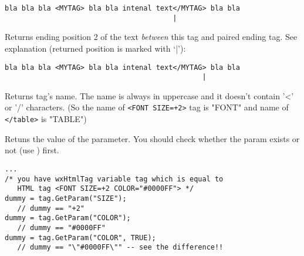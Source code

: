 \begin{verbatim}
bla bla bla <MYTAG> bla bla intenal text</MYTAG> bla bla
                                        |
\end{verbatim}


\label{wxhtmltaggetendpos2}


Returns ending position 2 of the text {\it between} this tag and paired
ending tag.
See explanation (returned position is marked with `|'):

\begin{verbatim}
bla bla bla <MYTAG> bla bla intenal text</MYTAG> bla bla
                                               |
\end{verbatim}

\label{wxhtmltaggetname}


Returns tag's name. The name is always in uppercase and it doesn't contain
'<' or '/' characters. (So the name of {\tt <FONT SIZE=+2>} tag is "FONT"
and name of {\tt </table>} is "TABLE")


\label{wxhtmltaggetparam}


Retuns the value of the parameter. You should check whether the
param exists or not (use ) first.





\begin{verbatim}
...
/* you have wxHtmlTag variable tag which is equal to
   HTML tag <FONT SIZE=+2 COLOR="#0000FF"> */
dummy = tag.GetParam("SIZE");
   // dummy == "+2"
dummy = tag.GetParam("COLOR");
   // dummy == "#0000FF"
dummy = tag.GetParam("COLOR", TRUE);
   // dummy == "\"#0000FF\"" -- see the difference!!
\end{verbatim}

\label{wxhtmltaghasending}


